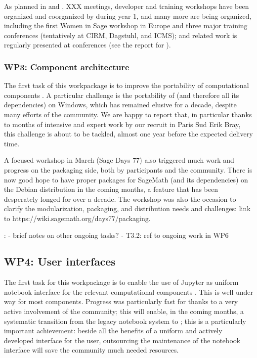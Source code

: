 \documentclass{deliverablereport}
\newcommand{\TODO}[1]{{\color{red}{TODO}: #1}}
\begin{document}
As planned in  and
, XXX meetings, developer and training
workshops have been organized and coorganized by \ODK during year 1,
and many more are being organized, including the first Women in Sage
workshop in Europe and three major training conferences (tentatively
at CIRM, Dagstuhl, and ICMS); \ODK and \ODK related work is regularly
presented at conferences (see the report for
).


\subsubsection{WP3: Component architecture}

The first task of this workpackage is to improve the portability of
computational components
. A particular challenge
is the portability of \Sage (and therefore all its dependencies)
on Windows, which has remained elusive for a decade, despite many
efforts of the community. We are happy to report that, in particular
thanks to months of intensive and expert work by our recruit in Paris
Sud Erik Bray, this challenge is about to be tackled, almost one year
before the expected delivery time.

A focused workshop in March (Sage Days 77) also triggered much work
and progress on the packaging side, both by \ODK participants and the
community. There is now good hope to have proper packages for SageMath
(and its dependencies) on the Debian distribution in the coming
months, a feature that has been desperately longed for over a decade.
The workshop was also the occasion to clarify the modularization,
packaging, and distribution needs and challenges\TODO{link to
https://wiki.sagemath.org/days77/packaging}.

\TODO{
- brief notes on other ongoing tasks?
- T3.2: ref to ongoing work in WP6
}
\subsection{WP4: User interfaces}

The first task for this workpackage is to enable the use of Jupyter as
uniform notebook interface for the relevant computational components
. This is well under way for most
components. Progress was particularly fast for \Sage thanks to a
very active involvement of the community; this will enable, in the
coming months, a systematic transition from the legacy \Sage
notebook system to \Jupyter; this is a particularly important
achievement: beside all the benefits of a uniform and actively
developed interface for the user, outsourcing the maintenance of the
notebook interface will save the \Sage community much needed
resources.
\end{document}

